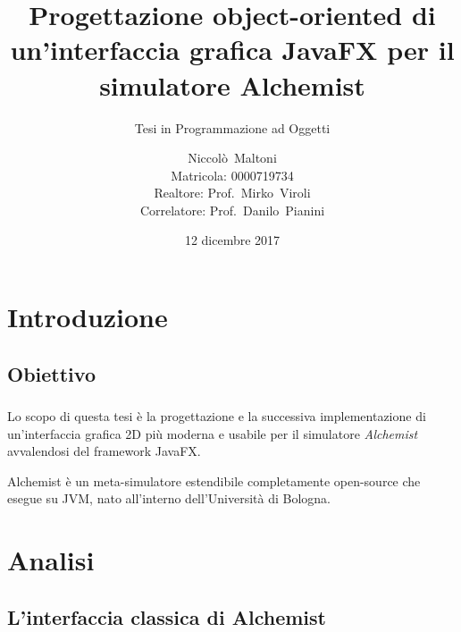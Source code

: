 \documentclass[%
]{beamer}
\title[Nuova GUI Alchemist in JavaFX]{%
    Progettazione object-oriented di un'interfaccia grafica %
    JavaFX per il simulatore Alchemist
}
\subtitle{Tesi in Programmazione ad Oggetti}
\author[Niccolò~Maltoni (0000719734)]{%
    Niccolò~Maltoni%
    \\ \small{Matricola: 0000719734}%
    \\ \vspace{10pt} \small{Realtore: Prof.~Mirko~Viroli \\Correlatore: Prof.~Danilo~Pianini}%
}
\date{12 dicembre 2017}
\institute[]{%
    Alma Mater Studiorum - Università di Bologna\\%
    Campus di Cesena%
}
\begin{document}
    \begin{frame}
        \titlepage
    \end{frame}

    \section{Introduzione}\label{sec:intro}
        \subsection{Obiettivo}\label{subsec:obiettivo}
            \begin{frame}
                \frametitle{\insertsection}
                \framesubtitle{\insertsubsection}
                Lo scopo di questa tesi è la progettazione e la successiva implementazione di un'interfaccia grafica 2D più moderna e usabile per il simulatore \emph{Alchemist} avvalendosi del framework JavaFX.

                \medskip

                Alchemist è un meta-simulatore estendibile completamente open-source che esegue su JVM, nato all’interno dell’Università di Bologna.
            \end{frame}

    \section{Analisi}\label{sec:analisi}
        \subsection{L'interfaccia classica di Alchemist}\label{subsec:oldgui}
            \begin{frame}
                \frametitle{\insertsection}
                \framesubtitle{\insertsubsection}
                \centering
            \end{frame}
\end{document}

